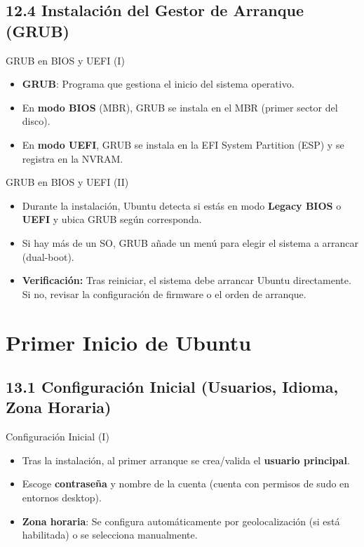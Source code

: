 \documentclass{beamer}
\begin{document}
\subsection{12.4 Instalación del Gestor de Arranque (GRUB)}
\begin{frame}{GRUB en BIOS y UEFI (I)}
	\begin{itemize}
		\item \textbf{GRUB}: Programa que gestiona el inicio del sistema operativo.
		\item En \textbf{modo BIOS} (MBR), GRUB se instala en el MBR (primer sector del disco).
		\item En \textbf{modo UEFI}, GRUB se instala en la EFI System Partition (ESP) y se registra en la NVRAM.
	\end{itemize}
\end{frame}

\begin{frame}{GRUB en BIOS y UEFI (II)}
	\begin{itemize}
		\item Durante la instalación, Ubuntu detecta si estás en modo \textbf{Legacy BIOS} o \textbf{UEFI} y ubica GRUB según corresponda.
		\item Si hay más de un SO, GRUB añade un menú para elegir el sistema a arrancar (dual-boot).
		\item \textbf{Verificación:} Tras reiniciar, el sistema debe arrancar Ubuntu directamente. Si no, revisar la configuración de firmware o el orden de arranque.
	\end{itemize}
\end{frame}

\section{Primer Inicio de Ubuntu}

\subsection{13.1 Configuración Inicial (Usuarios, Idioma, Zona Horaria)}
\begin{frame}{Configuración Inicial (I)}
	\begin{itemize}
		\item Tras la instalación, al primer arranque se crea/valida el \textbf{usuario principal}.
		\item Escoge \textbf{contraseña} y nombre de la cuenta (cuenta con permisos de sudo en entornos desktop).
		\item \textbf{Zona horaria}: Se configura automáticamente por geolocalización (si está habilitada) o se selecciona manualmente.
	\end{itemize}
\end{frame}
\end{document}
